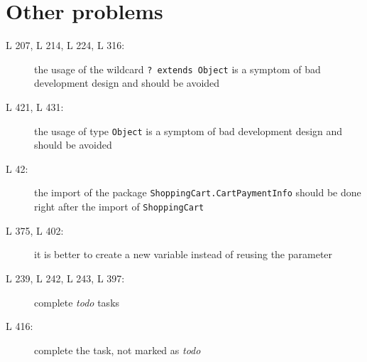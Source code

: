 \section{Other problems}
\begin{description}
	\item[L 207, L 214, L 224, L 316:] the usage of the wildcard {\tt ? extends Object} is a symptom of bad development design and should be avoided
	\item[L 421, L 431:] the usage of type {\tt Object} is a symptom of bad development design and should be avoided
	\item[L 42:] the import of the package {\tt ShoppingCart.CartPaymentInfo} should be done right after the import of {\tt ShoppingCart}
	\item[L 375, L 402:] it is better to create a new variable instead of reusing the parameter
	\item[L 239, L 242, L 243, L 397:]  complete \emph{todo} tasks
	\item[L 416:] complete the task, not marked as \emph{todo}
\end{description}